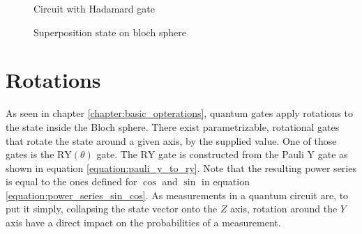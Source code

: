 \begin{figure}[!h]
    \centering
    \caption{Circuit with Hadamard gate}
    \label{fig:circuit_hadamard}
\end{figure}

\begin{figure}[!h]
    \centering
    \caption{Superposition state on bloch sphere}
    \label{fig:circuit_hadamard_bloch_sphere}
\end{figure}

\section{Rotations}
\label{chapter:rotations}

As seen in chapter \ref{chapter:basic_opterations}, quantum gates apply rotations to the state inside the Bloch sphere. There exist parametrizable, rotational gates that rotate the state around a given axis, by the supplied value. One of those gates is the $\mathrm{RY}(\theta)$ gate\cite{qiskit_rygate_nodate}. The $\mathrm{RY}$ gate is constructed from the Pauli $\mathrm{Y}$ gate as shown in equation \ref{equation:pauli_y_to_ry}. Note that the resulting power series is equal to the ones defined for $\cos$ and $\sin$ in equation \ref{equation:power_series_sin_cos}\cite{lars_complex_1978}. As measurements in a quantum circuit are, to put it simply, collapsing the state vector onto the $Z$ axis\cite{feynman_feynman_1965}, rotation around the $Y$ axis have a direct impact on the probabilities of a measurement.

